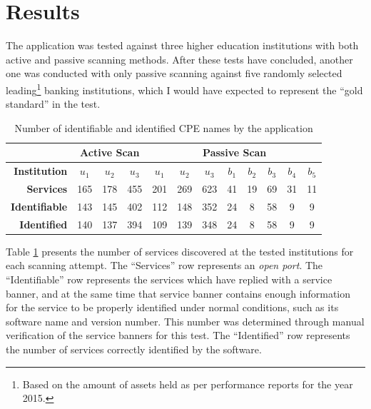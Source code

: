 \documentclass[a4paper,12pt]{article}
\begin{document}
\section{Results}
 

	The application was tested against three higher education institutions with both active and passive scanning methods. After these tests have concluded, another one was conducted with only passive scanning against five randomly selected leading\footnote{Based on the amount of assets held as per performance reports for the year 2015\cite{del15}.} banking institutions, which I would have expected to represent the ``gold standard'' in the test.

	\begin{table}[H]
		\centering
		\begin{tabular}{r|ccc|ccc|ccccc|}
			\cline{2-12}
			\multicolumn{1}{l|}{}                         & \multicolumn{3}{c|}{\textbf{Active Scan}} & \multicolumn{8}{c|}{\textbf{Passive Scan}}                                                             \\ \hline
			\multicolumn{1}{|r|}{\textbf{Institution}}      & \textbf{$u_1$}    & \textbf{$u_2$}    & \textbf{$u_3$}   & \textbf{$u_1$} & \textbf{$u_2$} & \textbf{$u_3$} & \textbf{$b_1$} & \textbf{$b_2$} & \textbf{$b_3$} & \textbf{$b_4$} & \textbf{$b_5$} \\ \hline
			\multicolumn{1}{|r|}{\textbf{Services}} & 165            & 178            & 455           & 201         & 269         & 623         & 41          & 19          & 69          & 31          & 11          \\
			\multicolumn{1}{|r|}{\textbf{Identifiable}} & 143            & 145            & 402           & 112         & 148         & 352         & 24          & 8           & 58          & 9           & 9           \\
			\multicolumn{1}{|r|}{\textbf{Identified}}   & 140            & 137            & 394           & 109         & 139         & 348         & 24          & 8           & 58          & 9           & 9           \\ \hline
		\end{tabular}
		\caption{Number of identifiable and identified CPE names by the application}
		\label{cpeids}
	\end{table}
	
	Table \ref{cpeids} presents the number of services discovered at the tested institutions for each scanning attempt. The ``Services'' row represents an \textit{open port}. The ``Identifiable'' row represents the services which have replied with a service banner, and at the same time that service banner contains enough information for the service to be properly identified under normal conditions, such as its software name and version number. This number was determined through manual verification of the service banners for this test. The ``Identified'' row represents the number of services correctly identified by the software.
	
\end{document}
